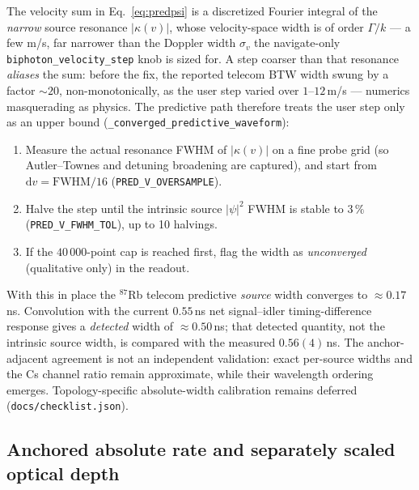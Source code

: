 \documentclass[11pt]{article}
\newcommand{\dd}{\mathrm{d}}
\newcommand{\code}[1]{\texttt{#1}}
\begin{document}
The velocity sum in Eq.~\eqref{eq:predpsi} is a discretized Fourier integral of
the \emph{narrow} source resonance $|\kappa(v)|$, whose velocity-space width is
of order $\Gamma/k$ --- a few m/s, far narrower than the Doppler width
$\sigma_v$ the navigate-only \code{biphoton\_velocity\_step} knob is sized for.
A step coarser than that resonance \emph{aliases} the sum: before the fix, the
reported telecom BTW width swung by a factor $\sim20$, non-monotonically, as
the user step varied over $1$--$12$\,m/s --- numerics masquerading as physics.
The predictive path therefore treats the user step only as an upper bound
(\code{\_converged\_predictive\_waveform}):
\begin{enumerate}[leftmargin=2.2em]
  \item Measure the actual resonance FWHM of $|\kappa(v)|$ on a fine probe grid
  (so Autler--Townes and detuning broadening are captured), and start from
  $\dd v=\mathrm{FWHM}/16$ (\code{PRED\_V\_OVERSAMPLE}).
  \item Halve the step until the intrinsic source $|\psi|^2$ FWHM is stable to
  $3\,\%$
  (\code{PRED\_V\_FWHM\_TOL}), up to 10 halvings.
  \item If the $40\,000$-point cap is reached first, flag the width as
  \emph{unconverged} (qualitative only) in the readout.
\end{enumerate}
With this in place the $^{87}$Rb telecom predictive \emph{source} width converges
to $\approx0.17$\,ns. Convolution with the current $0.55$\,ns net signal--idler
timing-difference response gives a \emph{detected} width of $\approx0.50$\,ns;
that detected quantity, not the intrinsic source width, is compared with the
measured $0.56(4)$\,ns. The anchor-adjacent agreement is not an independent
validation: exact per-source widths and the Cs channel ratio remain approximate,
while their wavelength ordering emerges.
Topology-specific absolute-width calibration remains deferred
(\code{docs/checklist.json}).

\subsection{Anchored absolute rate and separately scaled optical depth}
\end{document}
